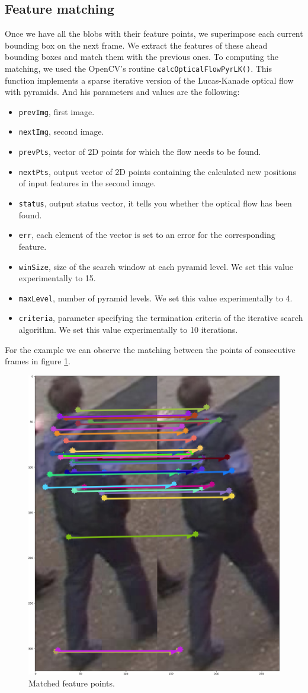 \subsection{Feature matching}


Once we have all the blobs with their feature points, we superimpose each current bounding box on the next frame. We extract the features of these ahead bounding boxes and match them with the previous ones. To computing the matching, we used the OpenCV's routine \texttt{calcOpticalFlowPyrLK()}. This function implements a sparse iterative version of the Lucas-Kanade optical flow with pyramids. And his parameters and values are the following:
 
\begin{itemize}

\item \texttt{prevImg}, first image.
\item \texttt{nextImg}, second image.
\item \texttt{prevPts}, vector of 2D points for which the flow needs to be found. 
\item \texttt{nextPts}, output vector of 2D points containing the calculated new positions of input features in the second image. 
\item \texttt{status}, output status vector, it tells you whether the optical flow has been found.  
\item \texttt{err}, each element of the vector is set to an error for the corresponding feature.
\item \texttt{winSize}, size of the search window at each pyramid level. We set this value experimentally to 15.
\item \texttt{maxLevel}, number of pyramid levels. We set this value experimentally to 4. 
\item \texttt{criteria}, parameter specifying the termination criteria of the iterative search algorithm. We set this value experimentally to 10 iterations.
\end{itemize}



For the example we can observe the matching between the points of consecutive frames in figure \ref{solution4}.

\begin{figure}[!]
\centering         
\includegraphics[width=0.3\linewidth]{implementation/matching.png}
\caption{Matched feature points.} \label{solution4}
\end{figure}





